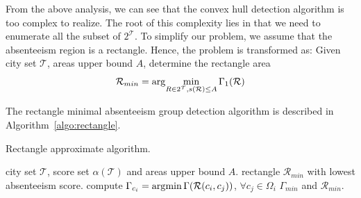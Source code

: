 From the above analysis, we can see that the convex hull detection algorithm is too complex to realize. The root of this complexity lies in that we need to enumerate all the subset of $2^{\mathcal{T}}$.
To simplify our problem, we assume that the absenteeism region is a rectangle. Hence, the problem is transformed as: Given city set $\mathcal{T}$, areas upper bound $A$, determine the rectangle area
 \begin{equation}
 \mathcal{R}_{min}=\arg\!\min\limits_{R\in 2^\mathcal{T}, s(\mathcal{R})\leq A}\Gamma_1(\mathcal{R})
\end{equation}

The rectangle minimal absenteeism group detection algorithm is described in Algorithm~\ref{algo:rectangle}.

\begin{algorithm}[t]
	\centering
	\captionsetup{font=scriptsize}
	\caption{Rectangle approximate algorithm.}
	{\footnotesize \begin{algorithmic}[1]
			 city set $\mathcal{T}$, score set $\alpha(\mathcal{T})$ and areas upper bound $A$.
			 rectangle $\mathcal{R}_{min}$ with lowest absenteeism score.
			\ENDFOR	
			\STATE compute $\Gamma_{c_i}=\arg\!\min\Gamma(\mathcal{R}(c_i, c_j))$, 	$\forall c_j\in \Omega_i$
			\ENDFOR
			\RETURN $\Gamma_{min}$ and  $\mathcal{R}_{min}$.
		\end{algorithmic}}
		\label{algo:rectangle}
	\end{algorithm}
	
	
	

